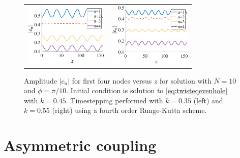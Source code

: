 \documentclass[reprint, amsmath,amssymb,aps,pra]{revtex4-2}
\begin{document}
\begin{figure}
\begin{center}
\begin{tabular}{cc}
\includegraphics[width=4cm]{even10pertk45to35} & 
\includegraphics[width=4cm]{even10pertk45to55}
\end{tabular}
\end{center}
\caption{Amplitude $|c_n|$ for first four nodes versus $z$ for solution with $N=10$ and $\phi = \pi/10$. Initial condition is solution to \cref{eq:twisteqevenhole} with $k = 0.45$. Timestepping performed with $k = 0.35$ (left) and $k = 0.55$ (right) using a fourth order Runge-Kutta scheme.}
\label{fig:evenholekperturbed}
\end{figure}

\section{Asymmetric coupling}\label{sec:variants}
\end{document}
